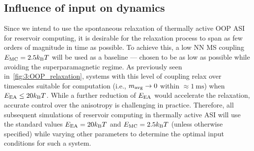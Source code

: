 \subsection{Influence of input on dynamics}
Since we intend to use the spontaneous relaxation of thermally active OOP ASI for reservoir computing, it is desirable for the relaxation process to span as few orders of magnitude in time as possible.
To achieve this, a low NN MS coupling $\EMC=2.5\kBT$ will be used as a baseline --- chosen to be as low as possible while avoiding the superparamagnetic regime.
As previously seen in~\cref{fig:3:OOP_relaxation}, systems with this level of coupling relax over timescales suitable for computation (i.e., $m_\mathrm{avg} \rightarrow 0$ within $\approx \SI{1}{\milli\second}$) when $\EEA \leq 20\kBT$.
While a further reduction of $E_\mathrm{EA}$ would accelerate the relaxation, accurate control over the anisotropy is challenging in practice.
Therefore, all subsequent simulations of reservoir computing in thermally active ASI will use the standard values $\EEA=20\kBT$ and $\EMC=2.5\kBT$ (unless otherwise specified) while varying other parameters to determine the optimal input conditions for such a system.

\vspace{-1em}

